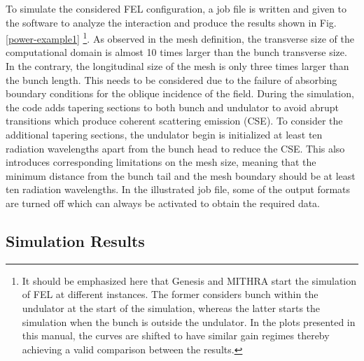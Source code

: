 To simulate the considered FEL configuration, a job file is written and given to the software to analyze the interaction and produce the results shown in Fig.\,\ref{power-example1} \footnote{It should be emphasized here that Genesis and MITHRA start the simulation of FEL at different instances. The former considers bunch within the undulator at the start of the simulation, whereas the latter starts the simulation when the bunch is outside the undulator. In the plots presented in this manual, the curves are shifted to have similar gain regimes thereby achieving a valid comparison between the results.}.
%
As observed in the mesh definition, the transverse size of the computational domain is almost 10 times larger than the bunch transverse size.
%
In the contrary, the longitudinal size of the mesh is only three times larger than the bunch length.
%
This needs to be considered due to the failure of absorbing boundary conditions for the oblique incidence of the field.
%
During the simulation, the code adds tapering sections to both bunch and undulator to avoid abrupt transitions which produce coherent scattering emission (CSE).
%
To consider the additional tapering sections, the undulator begin is initialized at least ten radiation wavelengths apart from the bunch head to reduce the CSE.
%
This also introduces corresponding limitations on the mesh size, meaning that the minimum distance from the bunch tail and the mesh boundary should be at least ten radiation wavelengths.
%
In the illustrated job file, some of the output formats are turned off which can always be activated to obtain the required data.

\subsection{Simulation Results}

